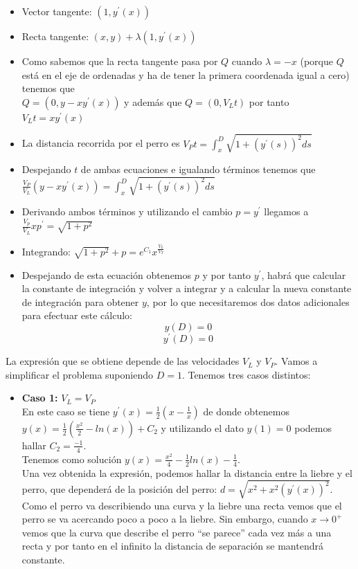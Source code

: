 \documentclass{mathnotes}
\begin{document}
\begin{example}
\begin{itemize}
\item Vector tangente: $(1, y^\prime(x))$
\item Recta tangente: $(x,y) + \lambda(1, y^\prime(x))$
\item Como sabemos que la recta tangente pasa por $Q$ cuando $\lambda = -x$ (porque $Q$ está en el eje de ordenadas y ha de tener la primera coordenada igual a cero) tenemos que \\$Q=(0, y-xy^\prime(x))$ y además que $Q=(0, V_Lt)$ por tanto $V_Lt = xy^\prime(x)$
\item La distancia recorrida por el perro es $V_Pt =\int_x^D{\sqrt{1+(y^\prime(s))^2ds}}$
\item Despejando $t$ de ambas ecuaciones e igualando términos tenemos que $\frac{V_P}{V_L}(y-xy^\prime(x))=\int_x^D{\sqrt{1+(y^\prime(s))^2ds}}$
\item Derivando ambos términos y utilizando el cambio $p=y^\prime$ llegamos a $\frac{V_p}{V_L}xp^\prime=\sqrt{1+p^2}$
\item Integrando: $\sqrt{1+p^2}+p = e^{C_1}x^\frac{V_L}{V_T}$
\item Despejando de esta ecuación obtenemos $p$ y por tanto $y^\prime$, habrá que calcular la constante de integración y volver a integrar y a calcular la nueva constante de integración para obtener $y$, por lo que necesitaremos dos datos adicionales para efectuar este cálculo:$$y(D)=0$$ $$y^\prime(D)=0$$
\end{itemize}
La expresión que se obtiene depende de las velocidades $V_L$ y $V_P$. Vamos a simplificar el problema suponiendo $D=1$. Tenemos tres casos distintos:
\begin{itemize}
\item \textbf{Caso 1:} $V_L=V_P$\\
En este caso se tiene $y^\prime(x) = \frac{1}{2}(x-\frac{1}{x})$ de donde obtenemos $y(x) = \frac{1}{2}(\frac{x^2}{2}-ln(x))+C_2$ y utilizando el dato $y(1) = 0$ podemos hallar $C_2=\frac{-1}{4}$.\\Tenemos como solución $y(x) = \frac{x^2}{4}-\frac{1}{2}ln(x)-\frac{1}{4}$.\\ Una vez obtenida la expresión, podemos hallar la distancia entre la liebre y el perro, que dependerá de la posición del perro: $d=\sqrt{x^2+x^2(y^\prime(x))^2}$.\\ Como el perro va describiendo una curva y la liebre una recta vemos que el perro se va acercando poco a poco a la liebre. Sin embargo, cuando $x\longrightarrow 0^+$ vemos que la curva que describe el perro ``se parece'' cada vez más a una recta y por tanto en el infinito la distancia de separación se mantendrá constante.\\

\end{itemize}
\end{example}
\end{document}
